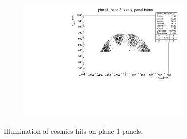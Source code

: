 \begin{figure}[!h]
\begin{subfigure}[b]{0.4\textwidth}
        \label{fig:panel4plane1}
    \end{subfigure}
    \hfill
    \begin{subfigure}[b]{0.4\textwidth}
        \centering
        \includegraphics[width=0.95\textwidth]{figures/pdf/plane1_panel5_x_vs_y_all.pdf}
        \label{fig:panel5plane1}
    \end{subfigure}
       \caption{Illumination of cosmics hits on plane 1 panels.}
       \label{fig:plane1}
\end{figure}